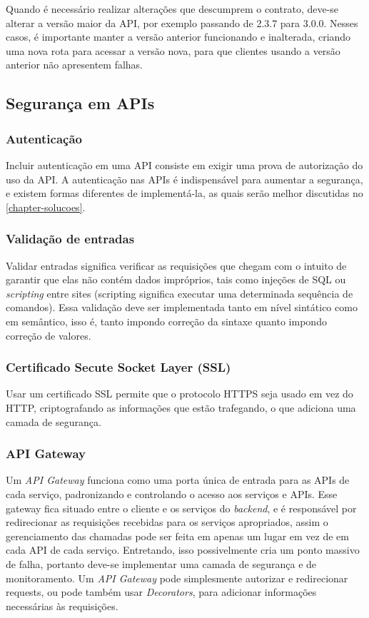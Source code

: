 Quando é necessário realizar alterações que descumprem o contrato, deve-se alterar a versão maior da API, por exemplo passando de 2.3.7 para 3.0.0. Nesses casos, é importante manter a versão anterior funcionando e inalterada, criando uma nova rota para acessar a versão nova, para que clientes usando a versão anterior não apresentem falhas.

\subsection{Segurança em APIs}

\subsubsection*{Autenticação}

Incluir autenticação em uma API consiste em exigir uma prova de autorização do uso da API. A autenticação nas APIs é indispensável para aumentar a segurança, e existem formas diferentes de implementá-la, as quais serão melhor discutidas no \autoref{chapter-solucoes}.

\subsubsection*{Validação de entradas}

Validar entradas significa verificar as requisições que chegam com o intuito de garantir que elas não contém dados impróprios, tais como injeções de SQL ou \emph{scripting} entre sites (scripting significa executar uma determinada sequência de comandos). Essa validação deve ser implementada tanto em nível sintático como em semântico, isso é, tanto impondo correção da sintaxe quanto impondo correção de valores. \cite{rapidAPI-twitter}

\subsubsection*{Certificado Secute Socket Layer (SSL)}
Usar um certificado SSL permite que o protocolo HTTPS seja usado em vez do HTTP, criptografando as informações que estão trafegando, o que adiciona uma camada de segurança. \cite{rapidAPI-twitter}

\subsubsection*{API Gateway}
Um \emph{API Gateway} funciona como uma porta única de entrada para as APIs de cada serviço, padronizando e controlando o acesso aos serviços e APIs. Esse gateway fica situado entre o cliente e os serviços do \emph{backend}, e é responsável por redirecionar as requisições recebidas para os serviços apropriados, assim o gerenciamento das chamadas pode ser feita em apenas um lugar em vez de em cada API de cada serviço. Entretando, isso possivelmente cria um ponto massivo de falha, portanto deve-se implementar uma camada de segurança e de monitoramento. Um \emph{API Gateway} pode simplesmente autorizar e redirecionar requests, ou pode também usar \emph{Decorators}, para adicionar informações necessárias às requisições. \cite{rapidAPI-twitter}

